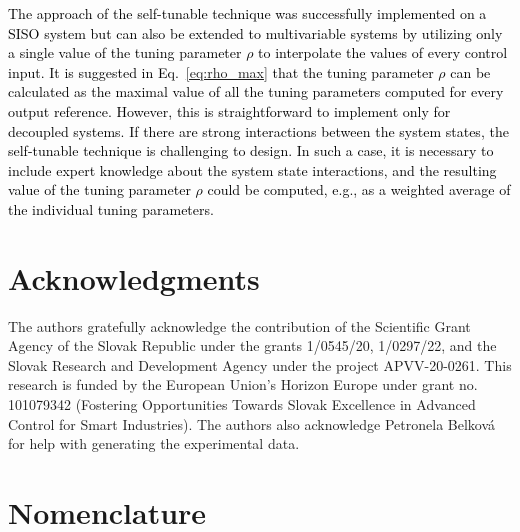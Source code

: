 \documentclass[preprint,12pt]{elsarticle}
\newcommand{\change}[1]{\textcolor{black}{#1}}
\begin{document}
	\change{The approach of the self-tunable technique was successfully implemented on a SISO system but can also be extended to multivariable systems by utilizing only a single value of the tuning parameter $\rho$ to interpolate the values of every control input. It is suggested in Eq.~\eqref{eq:rho_max} that the tuning parameter $\rho$ can be calculated as the maximal value of all the tuning parameters computed for every output reference. However, this is straightforward to implement only for decoupled systems. If there are strong interactions between the system states, the self-tunable technique is challenging to design. In such a case, it is necessary to include expert knowledge about the system state interactions, and the resulting value of the tuning parameter $\rho$ could be computed, e.g., as a weighted average of the individual tuning parameters.}
	\section*{Acknowledgments}
	
	The authors gratefully acknowledge the contribution of the Scientific Grant Agency of the Slovak Republic under the grants 1/0545/20, 1/0297/22, and the Slovak Research and Development Agency under the project APVV-20-0261. 
	This research is funded by the European Union’s Horizon Europe under grant no. 101079342 (Fostering Opportunities Towards Slovak Excellence in Advanced Control for Smart Industries). The authors also acknowledge Petronela Belková for help with generating the experimental data.   
	
	\section*{Nomenclature}
	
\end{document}
